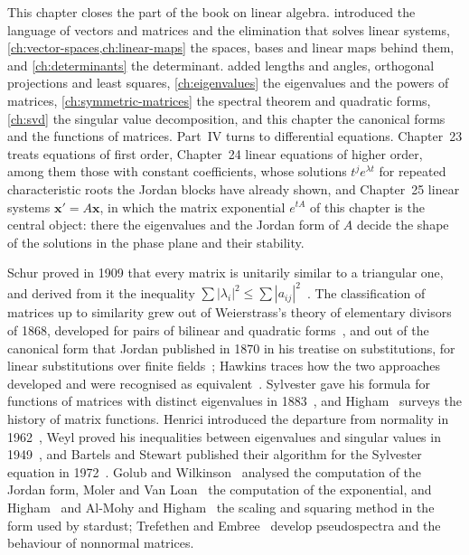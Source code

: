 This chapter closes the part of the book on linear algebra.  introduced the language of vectors and matrices and the elimination that solves linear systems, \cref{ch:vector-spaces,ch:linear-maps} the spaces, bases and linear maps behind them, and \cref{ch:determinants} the determinant.  added lengths and angles, orthogonal projections and least squares, \cref{ch:eigenvalues} the eigenvalues and the powers of matrices, \cref{ch:symmetric-matrices} the spectral theorem and quadratic forms, \cref{ch:svd} the singular value decomposition, and this chapter the canonical forms and the functions of matrices. Part~IV turns to differential equations. Chapter~23 treats equations of first order, Chapter~24 linear equations of higher order, among them those with constant coefficients, whose solutions $t^je^{\lambda t}$ for repeated characteristic roots the Jordan blocks have already shown, and Chapter~25 linear systems $\mathbf x'=A\mathbf x$, in which the matrix exponential $e^{tA}$ of this chapter is the central object: there the eigenvalues and the Jordan form of $A$ decide the shape of the solutions in the phase plane and their stability.

\chapternotes

Schur proved in 1909 that every matrix is unitarily similar to a triangular one, and derived from it the inequality $\sum|\lambda_i|^2\le\sum|a_{ij}|^2$~\cite{schur1909}. The classification of matrices up to similarity grew out of Weierstrass's theory of elementary divisors of 1868, developed for pairs of bilinear and quadratic forms~\cite{weierstrass1868}, and out of the canonical form that Jordan published in 1870 in his treatise on substitutions, for linear substitutions over finite fields~\cite{jordan1870}; Hawkins traces how the two approaches developed and were recognised as equivalent~\cite{hawkins1977}. Sylvester gave his formula for functions of matrices with distinct eigenvalues in 1883~\cite{sylvester1883}, and Higham~\cite[Chap.~1]{higham2008} surveys the history of matrix functions. Henrici introduced the departure from normality in 1962~\cite{henrici1962}, Weyl proved his inequalities between eigenvalues and singular values in 1949~\cite{weyl1949}, and Bartels and Stewart published their algorithm for the Sylvester equation in 1972~\cite{bartels1972}. Golub and Wilkinson~\cite{golubwilkinson1976} analysed the computation of the Jordan form, Moler and Van Loan~\cite{moler1978,moler2003} the computation of the exponential, and Higham~\cite{higham2005} and Al-Mohy and Higham~\cite{almohy2009} the scaling and squaring method in the form used by stardust; Trefethen and Embree~\cite{trefethen2005} develop pseudospectra and the behaviour of nonnormal matrices.

